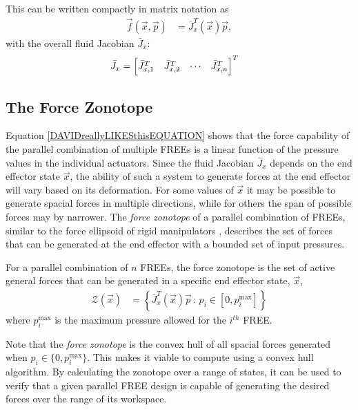 This can be written compactly in matrix notation as 
\begin{align}
    \vec{f} (\vec{x}, \vec{p}) &= \bar{J}^T_x (\vec{x}) \vec{p}, \label{DAVIDreallyLIKESthisEQUATION}
\end{align}
with the overall fluid Jacobian $\bar{J}_x$:
\begin{align}
    \bar{J}_x &= \begin{bmatrix} \bar{J}^T_{x, 1} & \bar{J}^T_{x, 2} & \cdots & \bar{J}^T_{x, n} \end{bmatrix}^T
\end{align}

\subsection{The Force Zonotope}
Equation \eqref{DAVIDreallyLIKESthisEQUATION} shows that the force capability of the parallel combination of multiple FREEs is a linear function of the pressure values in the individual actuators.
Since the fluid Jacobian $\bar{J}_{x}$ depends on the end effector state $\vec{x}$, the ability of such a system to generate forces at the end effector will vary based on its deformation.
For some values of $\vec{x}$ it may be possible to generate spacial forces in multiple directions, while for others the span of possible forces may by narrower. 
The \emph{force zonotope} of a parallel combination of FREEs, similar to the force ellipsoid of rigid manipulators \cite{spong2008robot}, describes the set of forces that can be generated at the end effector with a bounded set of input pressures.

\begin{definition}
    For a parallel combination of $n$ FREEs, the force zonotope is the set of active general 
    forces that can be generated in a specific end effector state, $\vec{x}$,
    \begin{align}
        \mathcal{Z}(\vec{x}) &= \left\{\bar{J}^T_x (\vec{x}) \vec{p} \, : \, p_i \in [0,p_i^\text{max}] \right\}     \label{eq:zonotope}
    \end{align}
    where $p_i^{\text{max}}$ is the maximum pressure allowed for the $i^{th}$ FREE.
\end{definition}

Note that the \emph{force zonotope} is the convex hull of all spacial forces generated when $p_i \in \{0, p_i^{\text{max}}\}$.
This makes it viable to compute using a convex hull algorithm. By calculating the zonotope over a range of states, it can be used to verify that a given parallel FREE design is capable of generating the desired forces over the range of its workspace. 



